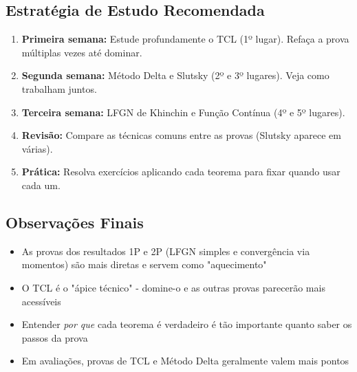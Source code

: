 \documentclass[12pt,a4paper]{article}
\theoremstyle{plain}
\theoremstyle{definition}
\theoremstyle{remark}
\begin{document}
\subsection{Estratégia de Estudo Recomendada}

\begin{enumerate}
    \item \textbf{Primeira semana:} Estude profundamente o TCL (1º lugar). Refaça a prova múltiplas vezes até dominar.
    
    \item \textbf{Segunda semana:} Método Delta e Slutsky (2º e 3º lugares). Veja como trabalham juntos.
    
    \item \textbf{Terceira semana:} LFGN de Khinchin e Função Contínua (4º e 5º lugares).
    
    \item \textbf{Revisão:} Compare as técnicas comuns entre as provas (Slutsky aparece em várias).
    
    \item \textbf{Prática:} Resolva exercícios aplicando cada teorema para fixar quando usar cada um.
\end{enumerate}

\subsection{Observações Finais}

\begin{itemize}
    \item As provas dos resultados 1P e 2P (LFGN simples e convergência via momentos) são mais diretas e servem como "aquecimento"
    
    \item O TCL é o "ápice técnico" - domine-o e as outras provas parecerão mais acessíveis
    
    \item Entender \emph{por que} cada teorema é verdadeiro é tão importante quanto saber os passos da prova
    
    \item Em avaliações, provas de TCL e Método Delta geralmente valem mais pontos
\end{itemize}
\end{document}
